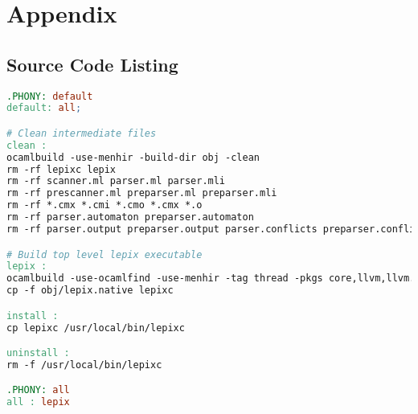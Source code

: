 \chapter{Appendix}

\section{Source Code Listing}

\begin{lstlisting}[language=make,caption=source/Makefile]
.PHONY: default
default: all;

# Clean intermediate files
clean :
ocamlbuild -use-menhir -build-dir obj -clean
rm -rf lepixc lepix
rm -rf scanner.ml parser.ml parser.mli
rm -rf prescanner.ml preparser.ml preparser.mli
rm -rf *.cmx *.cmi *.cmo *.cmx *.o
rm -rf parser.automaton preparser.automaton 
rm -rf parser.output preparser.output parser.conflicts preparser.conflicts 

# Build top level lepix executable
lepix :
ocamlbuild -use-ocamlfind -use-menhir -tag thread -pkgs core,llvm,llvm.analysis -build-dir obj lepix.native
cp -f obj/lepix.native lepixc

install :
cp lepixc /usr/local/bin/lepixc

uninstall :
rm -f /usr/local/bin/lepixc

.PHONY: all
all : lepix
\end{lstlisting}

















